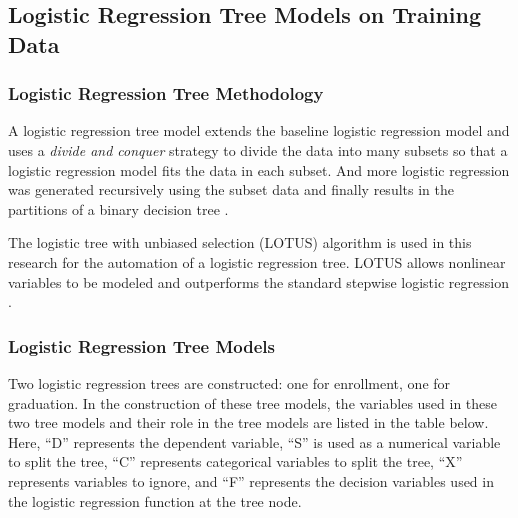 \documentclass[12pt,english]{report}
\begin{document}
\subsection{Logistic Regression Tree Models on Training Data}
\subsubsection{Logistic Regression Tree Methodology}
A logistic regression tree model extends the baseline logistic regression model and uses a \textit{divide and conquer} strategy to divide 
the data into many subsets so that a logistic regression model fits the data in each subset. And more logistic regression was generated
recursively using the subset data and finally results in the partitions of a binary decision tree \citep{harrell2013regression_book}.

The logistic tree with unbiased selection (LOTUS) algorithm \citep{lotus2} is used 
in this research for the automation of a logistic regression tree. LOTUS allows 
nonlinear variables to be modeled and outperforms the standard stepwise logistic 
regression \citep{lotus_app1,lotus_app2}.

\subsubsection{Logistic Regression Tree Models }
Two logistic regression trees are constructed: one for enrollment, one for 
graduation.  In the construction of these tree models, the variables used 
in these two tree models and their role in the tree models  are listed in 
the table below. Here, ``D'' represents the dependent variable, ``S'' is 
used as a numerical variable to split the tree, ``C'' represents 
categorical  variables to split the tree, ``X'' represents variables to 
ignore, and ``F'' represents the decision variables used in 
the logistic regression function at the tree node. 
\end{document}
